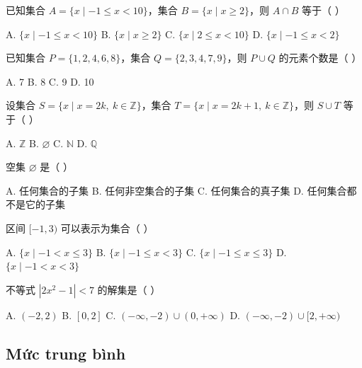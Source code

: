 \documentclass[11pt, a4paper]{article}
\begin{document}
\begin{baitap}[1]
已知集合 $A=\{x\mid -1\le x<10\}$，集合 $B=\{x\mid x\ge2\}$，则 $A\cap B$ 等于（ ）
\par\vspace{3pt}
\noindent A. $\{x\mid -1\le x<10\}$ \quad B. $\{x\mid x\ge2\}$ \quad C. $\{x\mid 2\le x<10\}$ \quad D. $\{x\mid -1\le x<2\}$
\end{baitap}
\begin{baitap}[2]
已知集合 $P=\{1,2,4,6,8\}$，集合 $Q=\{2,3,4,7,9\}$，则 $P\cup Q$ 的元素个数是（ ）
\par\vspace{3pt}
\noindent A. 7 \quad B. 8 \quad C. 9 \quad D. 10
\end{baitap}
\begin{baitap}[3]
设集合 $S=\{x\mid x=2k,\ k\in\mathbb{Z}\}$，集合 $T=\{x\mid x=2k+1,\ k\in\mathbb{Z}\}$，则 $S\cup T$ 等于（ ）
\par\vspace{3pt}
\noindent A. $\mathbb{Z}$ \quad B. $\varnothing$ \quad C. $\mathbb{N}$ \quad D. $\mathbb{Q}$
\end{baitap}
\begin{baitap}[4]
空集 $\varnothing$ 是（ ）
\par\vspace{3pt}
\noindent A. 任何集合的子集 \quad B. 任何非空集合的子集 \quad C. 任何集合的真子集 \quad D. 任何集合都不是它的子集
\end{baitap}
\begin{baitap}[5]
区间 $[-1,3)$ 可以表示为集合（ ）
\par\vspace{3pt}
\noindent A. $\{x\mid -1<x\le3\}$ \quad B. $\{x\mid -1\le x<3\}$ \quad C. $\{x\mid -1\le x\le3\}$ \quad D. $\{x\mid -1<x<3\}$
\end{baitap}
\begin{baitap}[6]
不等式 $|2x^2-1|<7$ 的解集是（ ）
\par\vspace{3pt}
\noindent A. $(-2,2)$ \quad B. $[0,2]$ \quad C. $(-\infty,-2)\cup(0,+\infty)$ \quad D. $(-\infty,-2)\cup[2,+\infty)$
\end{baitap}
\subsection{Mức trung bình}
\end{document}
